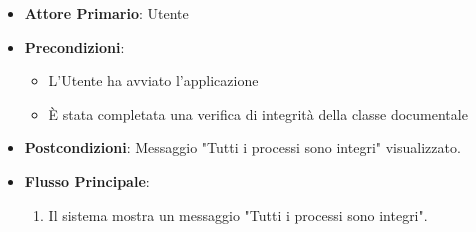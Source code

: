 \begin{itemize}
    \item \textbf{Attore Primario}: Utente
    \item \textbf{Precondizioni}: 
        \begin{itemize}
            \item L'Utente ha avviato l'applicazione
            \item È stata completata una verifica di integrità della classe documentale
        \end{itemize}  
    \item \textbf{Postcondizioni}: Messaggio "Tutti i processi sono integri" visualizzato.
    \item \textbf{Flusso Principale}:
        \begin{enumerate}
            \item Il sistema mostra un messaggio "Tutti i processi sono integri".
        \end{enumerate}
\end{itemize}

